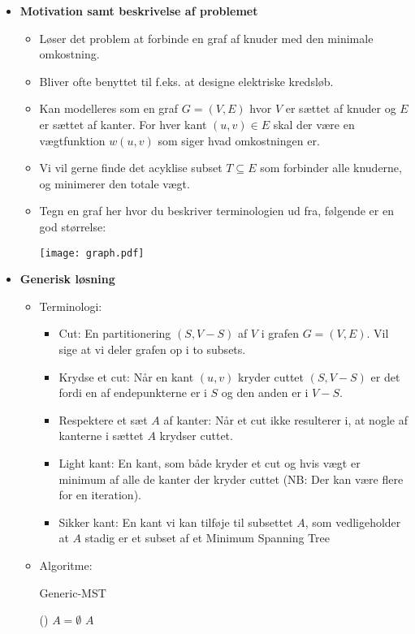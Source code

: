 \begin{itemize}
\item \textbf{Motivation samt beskrivelse af problemet}
\begin{itemize}
	\item Løser det problem at forbinde en graf af knuder med den minimale omkostning.
	\item Bliver ofte benyttet til f.eks. at designe elektriske kredsløb.
	\item Kan modelleres som en graf $G = (V, E)$ hvor $V$ er sættet af knuder og $E$ er sættet af kanter. For hver kant $(u, v) \in E$ skal der være en vægtfunktion $w(u, v)$ som siger hvad omkostningen er.
	\item Vi vil gerne finde det acyklise subset $T \subseteq E$ som forbinder alle knuderne, og minimerer den totale vægt.
	\item Tegn en graf her hvor du beskriver terminologien ud fra, følgende er en god størrelse:
	\begin{center}
		\texttt{[image: graph.pdf]}
	\end{center}
\end{itemize}


\item \textbf{Generisk løsning}
\begin{itemize}
	\item Terminologi:
	\begin{itemize}
		\item Cut: En partitionering $(S, V-S)$ af $V$ i grafen $G = (V, E)$. Vil sige at vi deler grafen op i to subsets.
		\item Krydse et cut: Når en kant $(u, v)$ kryder cuttet $(S, V-S)$ er det fordi en af endepunkterne er i $S$ og den anden er i $V-S$.
		\item Respektere et sæt $A$ af kanter: Når et cut ikke resulterer i, at nogle af kanterne i sættet $A$ krydser cuttet.
		\item Light kant: En kant, som både kryder et cut og hvis vægt er minimum af alle de kanter der kryder cuttet (NB: Der kan være flere for en iteration).
		\item Sikker kant: En kant vi kan tilføje til subsettet $A$, som vedligeholder at $A$ stadig er et subset af et Minimum Spanning Tree
	\end{itemize}
	\item Algoritme:\\
	\begin{algorithm}[H] \caption{Generic-MST} \label{alg:mst-gen}
		\Fn(){}{
			$A = \emptyset$\;
			\Return $A$\;
		}
	\end{algorithm}\vspace{1em}


\end{itemize}
\end{itemize}

